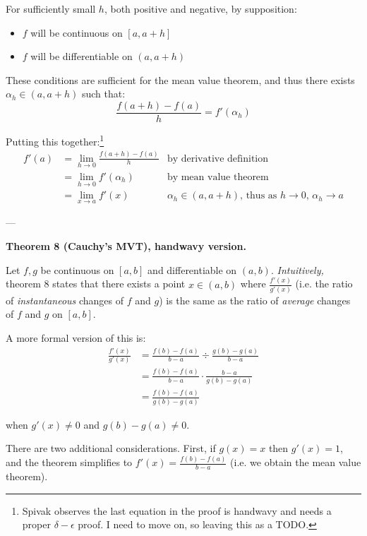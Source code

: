 For sufficiently small $h$, both positive and negative, by supposition:
\begin{itemize}
\item $f$ will be continuous on $[a,a+h]$
\item $f$ will be differentiable on $(a,a+h)$
\end{itemize}

These conditions are sufficient for the mean value theorem, and thus
there exists $\alpha_h\in(a, a+h)$ such that:
\[\frac{f(a+h)-f(a)}{h}=f'(\alpha_h)\]

Putting this together:\footnote{Spivak observes the last equation in
  the proof is handwavy and needs a proper $\delta-\epsilon$ proof. I need to move
  on, so leaving this as a TODO.}
\begin{align*}
  f'(a)&=\lim_{h\to0}\frac{f(a+h)-f(a)}{h}&\text{by derivative definition}\\
       &=\lim_{h\to0}f'(\alpha_h)&\text{by mean value theorem}\\
       &=\lim_{x\to a}f'(x)&\text{$\alpha_h\in(a,a+h)$, thus as $h\to0$, $\alpha_h\to a$}
\end{align*}

\vs---\vs

\textbf{Theorem 8 (Cauchy's MVT), handwavy version.}

\vs

Let $f,g$ be continuous on $[a,b]$ and differentiable on $(a,b)$.
\textit{Intuitively,} theorem 8 states that there exists a point
$x\in(a,b)$ where $\frac{f'(x)}{g'(x)}$ (i.e. the ratio of
\textit{instantaneous} changes of $f$ and $g$) is the same as the
ratio of \textit{average} changes of $f$ and $g$ on $[a,b]$.

\vs

A more formal version of this is:
\begin{align*}
  \frac{f'(x)}{g'(x)}&=\frac{f(b)-f(a)}{b-a}\div \frac{g(b)-g(a)}{b-a}\\
                     &=\frac{f(b)-f(a)}{b-a}\cdot \frac{b-a}{g(b)-g(a)}\\
                     &=\frac{f(b)-f(a)}{g(b)-g(a)}
\end{align*}

when $g'(x)\neq 0$ and $g(b)-g(a)\neq0$.

\vs

There are two additional considerations. First, if $g(x)=x$ then
$g'(x)=1$, and the theorem simplifies to $f'(x)=\frac{f(b)-f(a)}{b-a}$
(i.e. we obtain the mean value theorem).

